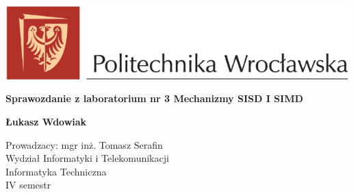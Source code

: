 \begin{titlepage}
    \begin{center}


        \vspace*{-3cm}

        \includegraphics[width=14cm]{images/image.png}

        \vspace*{2cm}
        \huge
        \textbf{Sprawozdanie z laboratorium nr 3 Mechanizmy SISD I SIMD}

        \vspace{0.5cm}


        \vspace{1.5cm}

        \textbf{Łukasz Wdowiak}

        \vspace{2cm}

        \vfill
        Prowadzacy: mgr inż. Tomasz Serafin \\
        \vspace{2cm}
        Wydział Informatyki i Telekomunikacji \\
        Informatyka Techniczna \\
        IV semestr\\




    \end{center}
\end{titlepage}